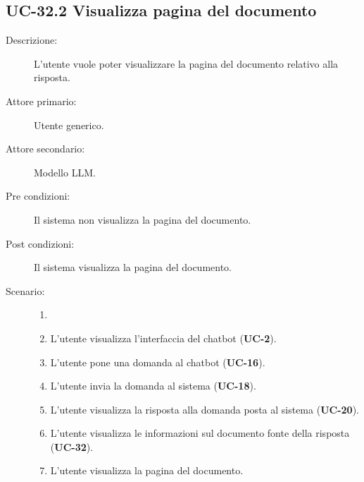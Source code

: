 \subsection{UC-32.2 Visualizza pagina del documento}
\begin{description}
    \item[Descrizione:] L'utente vuole poter visualizzare la pagina del documento relativo alla risposta.
    \item[Attore primario:] Utente generico.
    \item[Attore secondario:] Modello LLM.
    \item[Pre condizioni:] Il sistema non visualizza la pagina del documento.
    \item[Post condizioni:] Il sistema visualizza la pagina del documento.
    \item[Scenario:] 
    \begin{enumerate}
        \item[] 
        \item L’utente visualizza l'interfaccia del chatbot (\textbf{UC-2}).
        \item L’utente pone una domanda al chatbot (\textbf{UC-16}).
        \item L'utente invia la domanda al sistema (\textbf{UC-18}).
        \item L'utente visualizza la risposta alla domanda posta al sistema (\textbf{UC-20}).
        \item L'utente visualizza le informazioni sul documento fonte della risposta (\textbf{UC-32}).
        \item L'utente visualizza la pagina del documento.
    \end{enumerate}
\end{description}

